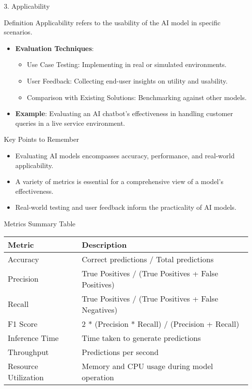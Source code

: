 \documentclass[aspectratio=169]{beamer}
\begin{document}
\begin{frame}[fragile]{3. Applicability}
    \begin{block}{Definition}
        Applicability refers to the usability of the AI model in specific scenarios.
    \end{block}
    
    \begin{itemize}
        \item \textbf{Evaluation Techniques}:
            \begin{itemize}
                \item Use Case Testing: Implementing in real or simulated environments.
                \item User Feedback: Collecting end-user insights on utility and usability.
                \item Comparison with Existing Solutions: Benchmarking against other models.
            \end{itemize}
        \item \textbf{Example}: Evaluating an AI chatbot's effectiveness in handling customer queries in a live service environment.
    \end{itemize}
\end{frame}

\begin{frame}[fragile]{Key Points to Remember}
    \begin{itemize}
        \item Evaluating AI models encompasses accuracy, performance, and real-world applicability.
        \item A variety of metrics is essential for a comprehensive view of a model's effectiveness.
        \item Real-world testing and user feedback inform the practicality of AI models.
    \end{itemize}
\end{frame}

\begin{frame}[fragile]{Metrics Summary Table}
    \begin{tabular}{|l|l|}
        \hline
        \textbf{Metric} & \textbf{Description} \\
        \hline
        Accuracy & Correct predictions / Total predictions \\
        Precision & True Positives / (True Positives + False Positives) \\
        Recall & True Positives / (True Positives + False Negatives) \\
        F1 Score & 2 * (Precision * Recall) / (Precision + Recall) \\
        Inference Time & Time taken to generate predictions \\
        Throughput & Predictions per second \\
        Resource Utilization & Memory and CPU usage during model operation \\
        \hline
    \end{tabular}
\end{frame}
\end{document}
